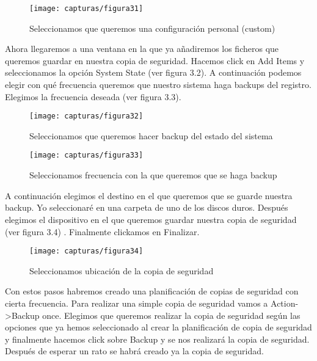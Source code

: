 	\begin{figure} [H]
	\centering
	\texttt{[image: capturas/figura31]}
	\caption{Seleccionamos que queremos una configuración personal (custom)}
	\label{fig:figura31}
	\end{figure}

	Ahora llegaremos a una ventana en la que ya añadiremos los ficheros que queremos guardar en nuestra copia de seguridad. Hacemos click en Add Items y seleccionamos la opción System State (ver figura 3.2). A continuación podemos elegir con qué frecuencia queremos que nuestro sistema haga backups del registro. Elegimos la frecuencia deseada (ver figura  3.3).
	
	\begin{figure} [H]
	\centering
	\texttt{[image: capturas/figura32]}
	\caption{Seleccionamos que queremos hacer backup del estado del sistema}
	\label{fig:figura32}
	\end{figure}

	\begin{figure} [H]
	\centering
	\texttt{[image: capturas/figura33]}
	\caption{Seleccionamos frecuencia con la que queremos que se haga backup}
	\label{fig:figura33}
	\end{figure}
	
	\newpage
	
	A continuación elegimos el destino en el que queremos que se guarde nuestra backup. Yo seleccionaré en una carpeta de uno de los discos duros. Después elegimos el dispositivo en el que queremos guardar nuestra copia de seguridad (ver figura 3.4) . Finalmente clickamos en Finalizar.
	
	\begin{figure} [H]
	\centering
	\texttt{[image: capturas/figura34]}
	\caption{Seleccionamos ubicación de la copia de seguridad}
	\label{fig:figura34}
	\end{figure}

	Con estos pasos habremos creado una planificación de copias de seguridad con cierta frecuencia. Para realizar una simple copia de seguridad vamos a Action->Backup once. Elegimos que queremos realizar la copia de seguridad según las opciones que ya hemos seleccionado al crear la planificación de copia de seguridad y finalmente hacemos click sobre Backup y se nos realizará la copia de seguridad. Después de esperar un rato se habrá creado ya la copia de seguridad.
	\\
	
